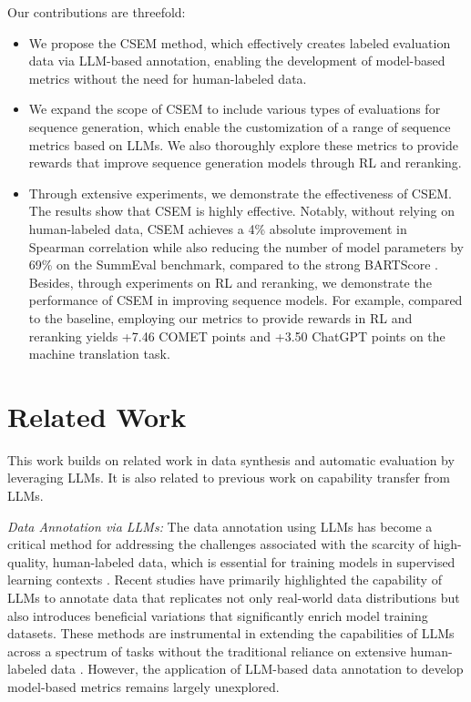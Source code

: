 \documentclass[lettersize,journal]{IEEEtran}
\begin{document}
Our contributions are threefold: 
\begin{itemize}
    \item We propose the CSEM method, which effectively creates labeled evaluation data via LLM-based annotation, enabling the development of model-based metrics without the need for human-labeled data.
    \item We expand the scope of CSEM to include various types of evaluations for sequence generation, which enable the customization of a range of sequence metrics based on LLMs. We also thoroughly explore these metrics to provide rewards that improve sequence generation models through RL and reranking.
    \item Through extensive experiments, we demonstrate the effectiveness of CSEM. The results show that CSEM is highly effective. Notably, without relying on human-labeled data, CSEM achieves a 4\% absolute improvement in Spearman correlation while also reducing the number of model parameters by 69\% on the SummEval benchmark, compared to the strong BARTScore \cite{yuan2021bartscore}. Besides, through experiments on RL and reranking, we demonstrate the performance of CSEM in improving sequence models. For example, compared to the baseline, employing our metrics to provide rewards in RL and reranking yields +7.46 COMET points and +3.50 ChatGPT points on the machine translation task.
\end{itemize}


\section{Related Work}
This work builds on related work in data synthesis and automatic evaluation by leveraging LLMs. It is also related to previous work on capability transfer from LLMs.

\textit{Data Annotation via LLMs:}
The data annotation using LLMs has become a critical method for addressing the challenges associated with the scarcity of high-quality, human-labeled data, which is essential for training models in supervised learning contexts \cite{schick2021generating,nijkamp2022codegen,wang2024survey}. Recent studies have primarily highlighted the capability of LLMs to annotate data that replicates not only real-world data distributions but also introduces beneficial variations that significantly enrich model training datasets. These methods are instrumental in extending the capabilities of LLMs across a spectrum of tasks without the traditional reliance on extensive human-labeled data \cite{austin2021program}. However, the application of LLM-based data annotation to develop model-based metrics remains largely unexplored.
\end{document}
